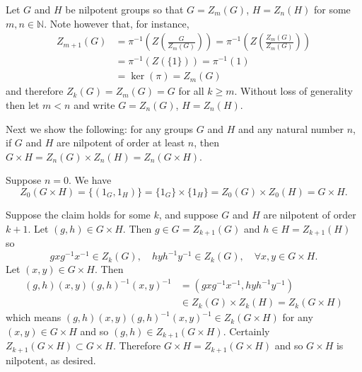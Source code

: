 \documentclass{article}
\begin{document}
\begin{Answer}
\begin{enumerate}[(a)]
{\begin{itemize}
{        Let $G$ and $H$ be nilpotent groups so that $G = Z_m(G)$,
        $H = Z_n(H)$ for some $m, n \in \mathbb{N}$. Note however
        that, for instance,
        \begin{align*}
          Z_{m+1}(G)
       &= \pi^{-1}\left(Z\left(\frac{G}{Z_{m}(G)}\right)\right)
        = \pi^{-1}\left(Z\left(\frac{Z_m(G)}{Z_m(G)}\right)\right) \\
       &= \pi^{-1}\left(Z(\{ 1 \})\right)
        = \pi^{-1}(1) \\
       &= \ker(\pi)
        = Z_{m}(G)
        \end{align*}
        and therefore $Z_k(G) = Z_m(G) = G$ for all $k \geq m$.
        Without loss of generality then let $m < n$ and write
        $G = Z_n(G)$, $H = Z_n(H)$.

        Next we show the following: for any groups $G$ and $H$ and
        any natural number $n$, if $G$ and $H$ are nilpotent of order
        at least $n$, then
        $G \times H = Z_n(G) \times Z_n(H) = Z_n(G \times H)$.

        Suppose $n = 0$. We have
        $$
          Z_0(G \times H)
        = \{ (1_G, 1_H) \}
        = \{ 1_G \} \times \{ 1_H \}
        = Z_0(G) \times Z_0(H)
        = G \times H.
        $$

        Suppose the claim holds for some $k$, and suppose
        $G$ and $H$ are nilpotent of order $k+1$.
        Let $(g, h) \in G \times H$.
        Then $g \in G = Z_{k+1}(G)$
        and $h \in H = Z_{k+1}(H)$ so
        $$
        g x g^{-1} x^{-1} \in Z_{k}(G), \quad
        h y h^{-1} y^{-1} \in Z_{k}(G), \quad
        \forall x, y \in G \times H.
        $$
        Let $(x, y) \in G \times H$. Then
        \begin{align*}
             (g, h) (x, y) (g, h)^{-1} (x, y)^{-1}
         &=  (g x g^{-1} x^{-1}, h y h^{-1} y^{-1}) \\
        &\in Z_k(G) \times Z_k(H) = Z_k(G \times H)
        \end{align*}
        which means
        $(g, h)(x, y)(g, h)^{-1}(x, y)^{-1} \in Z_k(G \times H)$ for
        any $(x, y) \in G \times H$ and
        so $(g, h) \in Z_{k+1}(G \times H)$. Certainly
        $Z_{k+1}(G \times H) \subset G \times H$. Therefore
        $G \times H = Z_{k+1}(G \times H)$ and so $G \times H$ is
        nilpotent, as desired.
      }
    \end{itemize}
  }
\end{enumerate}
\end{Answer}
\end{document}
